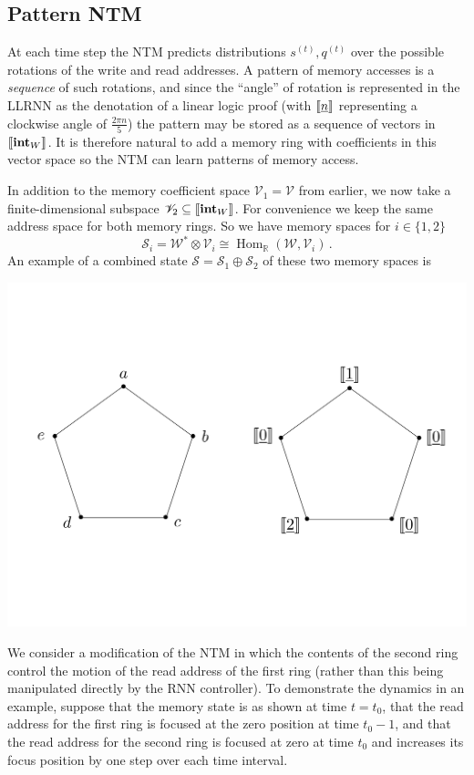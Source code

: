 \documentclass[english,letter paper,12pt,leqno]{article}
\theoremstyle{example}
\numberwithin{equation}{section}
\def\Hom{\operatorname{Hom}}
\begin{document}
\subsection{Pattern NTM}\label{example:ntm_extended}

At each time step the NTM predicts distributions $s^{(t)}, q^{(t)}$ over the possible rotations of the write and read addresses. A pattern of memory accesses is a \emph{sequence} of such rotations, and since the ``angle'' of rotation is represented in the LLRNN as the denotation of a linear logic proof (with $\llbracket \underline{n} \rrbracket$ representing a clockwise angle of $\frac{2\pi n}{5}$) the pattern may be stored as a sequence of vectors in $\llbracket \textbf{int}_W \rrbracket$. It is therefore natural to add a memory ring with coefficients in this vector space so the NTM can learn patterns of memory access.

In addition to the memory coefficient space $\mathscr{V}_1 = \mathscr{V}$ from earlier, we now take a finite-dimensional subspace $\mathscr{V}_2 \subseteq \llbracket \textbf{int}_W \rrbracket$. For convenience we keep the same address space for both memory rings. So we have memory spaces for $i \in \{1,2\}$
\[
\mathscr{S}_i = \mathscr{W}^* \otimes \mathscr{V}_i \cong \Hom_{\mathbb{R}}(\mathscr{W}, \mathscr{V}_i)\,.
\]
An example of a combined state $\mathscr{S} = \mathscr{S}_1 \oplus \mathscr{S}_2$ of these two memory spaces is
\begin{center}
\includegraphics[scale=0.3]{dia2}
\end{center}
We consider a modification of the NTM in which the contents of the second ring control the motion of the read address of the first ring (rather than this being manipulated directly by the RNN controller). To demonstrate the dynamics in an example, suppose that the memory state is as shown at time $t = t_0$, that the read address for the first ring is focused at the zero position at time $t_0 - 1$, and that the read address for the second ring is focused at zero at time $t_0$ and increases its focus position by one step over each time interval. 
\end{document}
